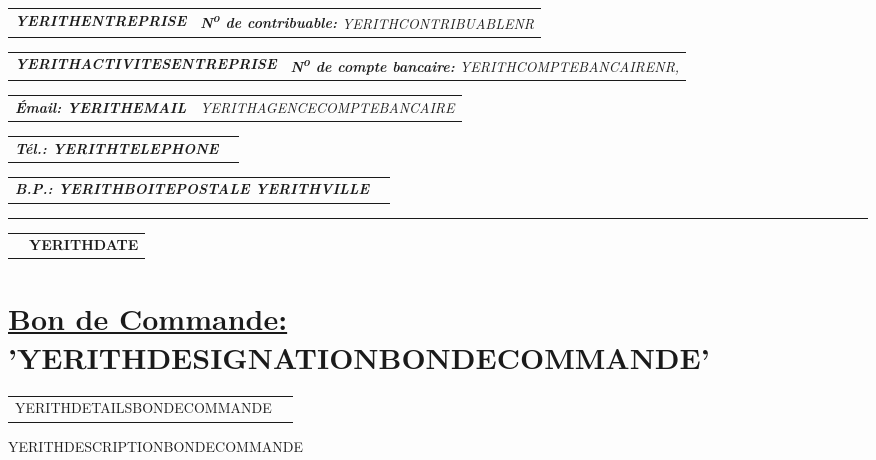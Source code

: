 \documentclass[10pt, YERITHPAPERSPEC]{article} %
\makeatletter
\newcommand{\headerrow}[2]
{\begin{tabular*}{\linewidth}{l@{\extracolsep{\fill}}r}
	#1 &
	#2 \\
\end{tabular*}}
\newcommand{\emphbold}[1]{\textbf{\emph{#1}}\xspace}
\makeatother
\begin{document}
\bigskip

\headerrow
	{\emphbold{YERITHENTREPRISE}}
	{\emph{\textbf{N\textsuperscript{o} de contribuable:} YERITHCONTRIBUABLENR}}
\headerrow
	{\emphbold{YERITHACTIVITESENTREPRISE}}
	{\emph{\textbf{N\textsuperscript{o} de compte bancaire:} YERITHCOMPTEBANCAIRENR,}}
\headerrow
	{\emphbold{\'Email: YERITHEMAIL}}
	{\emph{YERITHAGENCECOMPTEBANCAIRE}}
\headerrow
	{\emphbold{T\'el.: YERITHTELEPHONE}}
	{}
\headerrow
	{\emphbold{B.P.: YERITHBOITEPOSTALE YERITHVILLE}}
	{}
	
\hrule

\headerrow
	{}
	{\textbf{YERITHDATE}}

\vspace*{0.9cm}


\section*{\underline{Bon de Commande:} 'YERITHDESIGNATIONBONDECOMMANDE'}


\vspace{0.3cm} 

\begin{table}[!htbp]
\begin{tabular}{ll}
\parbox{27em}{
YERITHDETAILSBONDECOMMANDE
}

&

\parbox{15em}{

}
\end{tabular}
\end{table}

\vspace{0.3cm}

YERITHDESCRIPTIONBONDECOMMANDE
\end{document}

